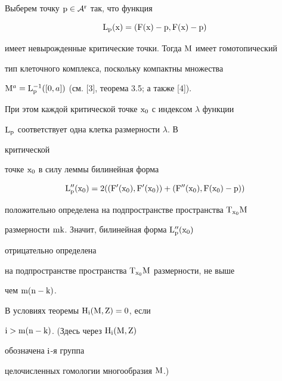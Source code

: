  


\begin{pf} 


Выберем точку $\mathrm p\in\cal A^{\mathrm r}$ так, что функция 


$$ 


\M L_{\M p}(\M x)=(\M F(\M x)-\M p, 


\M F(\M x)-\M p) 


$$ 


имеет невырожденные критические точки. Тогда $\mathrm M$ имеет гомотопический 


тип клеточного комплекса, поскольку компактны множества 


$\mathrm M^a=\mathrm L_{\mathrm p}^{-1}([0,a])$ (см. [3], теорема 3.5; а также [4]). 


При этом каждой критической точке $\mathrm x_0$ с индексом $\lambda$ функции 


$\mathrm L_{\mathrm p}$ соответствует одна клетка размерности $\lambda$. В 


критической 


точке $\mathrm x_0$ в силу леммы билинейная форма 


$$ 


\M L''_{\M p}(\M x_0)=2((\M F'(\M x_0),\M F'(\M x_0))+ 


(\M F''(\M x_0),\M F(\M x_0)-\M p)) 


$$ 


положительно определена на подпространстве пространства $\M T_{\M 


x_0}\M M$ 


размерности $\mathrm {mk}$. Значит, билинейная форма $\mathrm L''_{\mathrm p}(\mathrm x_0)$ 


отрицательно определена 


на подпространстве пространства $\mathrm T_{\mathrm x_0}\mathrm M$ размерности, не выше 


чем $\mathrm m(\mathrm n-\mathrm k)$. 


\end{pf} 


 


\begin{cor} 


В условиях теоремы $\mathrm H_{\mathrm i}(\mathrm M,\mathrm Z)=0$, если 


$\mathrm i>\mathrm m(\mathrm n-\mathrm k)$. (Здесь через $\mathrm H_{\mathrm i}(\mathrm M,\mathrm Z)$ 


обозначена $\mathrm i$-я группа 


целочисленных гомологии многообразия $\mathrm M$.) 


\end{cor} 


